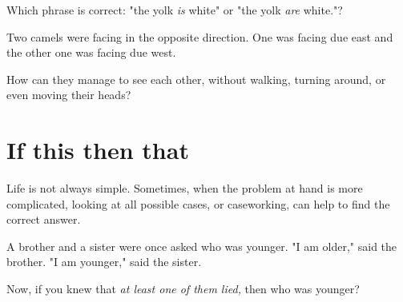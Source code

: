\documentclass{article}
\begin{document}
\bigbreak

\begin{exercise*}
    \label{exercise:pi-2022-4-p5}
    Which phrase is correct: "the yolk \textit{is} white" or "the yolk \textit{are} white."?
\end{exercise*}

\begin{exercise*}
    \label{exercise:pi-2022-4-p6}
    Two camels were facing in the opposite direction.
    One was facing due east and the other one was facing due west.

    How can they manage to see each other, without walking, turning around, or even moving their heads?
\end{exercise*}

\newpage 

\section*{If this then that}

Life is not always simple. Sometimes, when the problem at hand is more complicated, 
looking at all possible cases, or caseworking, can help to find the correct answer.

\begin{example*}
    \label{example:pi-2022-4-p7}
    A brother and a sister were once asked who was younger. "I am older," said the brother.
    "I am younger," said the sister.

    Now, if you knew that \textit{at least one of them lied,}
    then who was younger?
\end{example*}
\end{document}

